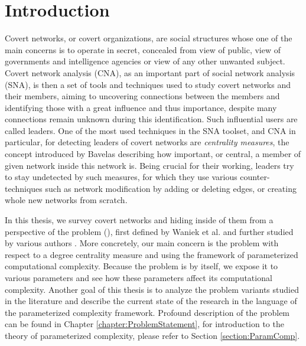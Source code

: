 \chapter*{Introduction}

\setcounter{page}{1}

Covert networks, or covert organizations, are social structures whose one of the main concerns is to operate in secret,
concealed from view of public, view of governments and intelligence agencies or view of any other unwanted subject.
Covert network analysis (CNA), as an important part of social network analysis (SNA),
is then a set of tools and techniques used to study covert networks and their members,
aiming to uncovering connections between the members and identifying those with a great
influence and thus importance, despite many connections remain unknown during this identification.
Such influential users are called leaders.
One of the most used techniques in the SNA toolset, and CNA in particular, for detecting leaders of covert networks
are \emph{centrality measures},
the concept introduced by Bavelas \cite{Bavelas1948} describing how important, or central,
a member of given network inside this network is.
Being crucial for their working, leaders try to stay undetected by such measures,
for which they use various counter-techniques such as
network modification by adding or deleting edges, or creating whole new networks from scratch.

In this thesis, we survey covert networks and hiding inside of them from a perspective of the \HL problem (\HLshort), first defined by
Waniek et al. \cite{Waniek2017} and further studied by various authors \cite{Dey2019,Waniek2021,Mohan2023}.
More concretely, our main concern is the \HL problem with respect to a degree centrality measure
and using the framework of parameterized computational complexity.
Because the problem is \NPh by itself, we expose it to various parameters and
see how these parameters affect its computational complexity.
Another goal of this thesis is to analyze the problem variants studied in the literature
and describe the current state of the research in the language of the parameterized complexity framework.
Profound description of the \HL problem can be found in Chapter \ref{chapter:ProblemStatement}, for introduction to
the theory of parameterized complexity, please refer to Section \ref{section:ParamComp}.
